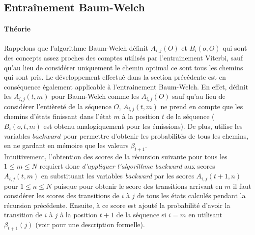 \documentclass[letterpaper]{article}
\begin{document}
\subsection{Entraînement Baum-Welch}
\paragraph{Théorie}
Rappelons que l'algorithme Baum-Welch définit $A_{i,j}(O)$ et $B_i(o, O)$ qui sont des concepts assez proches des comptes utilisés par l'entrainement Viterbi, sauf qu'au lieu de considérer uniquement le chemin optimal ce sont tous les chemins qui sont pris. Le développement effectué dans la section précédente est en conséquence également applicable à l'entrainement Baum-Welch. En effet, \cite{MM} définit les $A_{i,j}(t,m)$ pour Baum-Welch comme les $A_{i,j}(O)$ sauf qu'au lieu de considérer l'entièreté de la séquence $O$, $A_{i,j}(t,m)$ ne prend en compte que les chemins d'états finissant dans l'état $m$ à la position $t$ de la séquence ($B_i(o, t, m)$ est obtenu analogiquement pour les émissions). De plus, \cite{Ch} utilise les variables $backward$ pour permettre d'obtenir les probabilités de tous les chemins, en ne gardant en mémoire que les valeurs $\beta_{t+1}$. \\

Intuitivement, l'obtention des scores de la récursion suivante pour tous les $1 \leq m \leq N$ requiert donc \textit{d'appliquer l'algorithme backward} aux scores $A_{i,j}(t,m)$ en substituant les variables \textit{backward} par les scores $A_{i,j}(t+1,n)$ pour $1 \leq n \leq N$ puisque pour obtenir le score des transitions arrivant en $m$ il faut considérer les scores des transitions de $i$ à $j$ de tous les états calculés pendant la récursion précédente. Ensuite, à ce score est ajouté la probabilité d'avoir la transition de $i$ à $j$ à la position $t+1$ de la séquence si $i=m$ en utilisant $\beta_{t+1}(j)$ (voir \cite{Ch} pour une description formelle).
\end{document}
